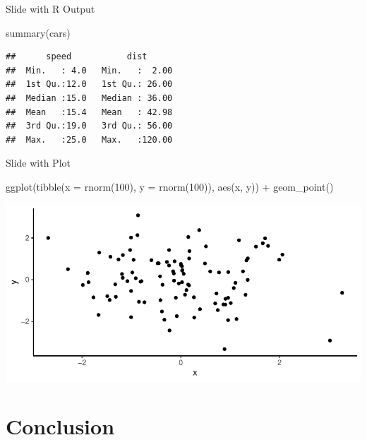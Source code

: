\documentclass[,aspectratio=43]{beamer}
\newenvironment{Shaded}{\begin{snugshade}}{\end{snugshade}}
\newcommand{\AttributeTok}[1]{\textcolor[rgb]{0.77,0.63,0.00}{#1}}
\newcommand{\DecValTok}[1]{\textcolor[rgb]{0.00,0.00,0.81}{#1}}
\newcommand{\FunctionTok}[1]{\textcolor[rgb]{0.00,0.00,0.00}{#1}}
\newcommand{\NormalTok}[1]{#1}
\newcommand{\SpecialCharTok}[1]{\textcolor[rgb]{0.00,0.00,0.00}{#1}}
\begin{document}
\begin{frame}[fragile]{Slide with R Output}
\protect\hypertarget{slide-with-r-output}{}
\begin{Shaded}
\begin{Highlighting}[]
\FunctionTok{summary}\NormalTok{(cars)}
\end{Highlighting}
\end{Shaded}

\begin{verbatim}
##      speed           dist       
##  Min.   : 4.0   Min.   :  2.00  
##  1st Qu.:12.0   1st Qu.: 26.00  
##  Median :15.0   Median : 36.00  
##  Mean   :15.4   Mean   : 42.98  
##  3rd Qu.:19.0   3rd Qu.: 56.00  
##  Max.   :25.0   Max.   :120.00
\end{verbatim}
\end{frame}

\begin{frame}[fragile]{Slide with Plot}
\protect\hypertarget{slide-with-plot}{}
\begin{Shaded}
\begin{Highlighting}[]
\FunctionTok{ggplot}\NormalTok{(}\FunctionTok{tibble}\NormalTok{(}\AttributeTok{x =} \FunctionTok{rnorm}\NormalTok{(}\DecValTok{100}\NormalTok{), }\AttributeTok{y =} \FunctionTok{rnorm}\NormalTok{(}\DecValTok{100}\NormalTok{)), }\FunctionTok{aes}\NormalTok{(x, y)) }\SpecialCharTok{+}
  \FunctionTok{geom\_point}\NormalTok{()}
\end{Highlighting}
\end{Shaded}

\begin{center}\includegraphics{figure/slideplot-1} \end{center}
\end{frame}

\hypertarget{conclusion}{%
\section{Conclusion}\label{conclusion}}
\end{document}
